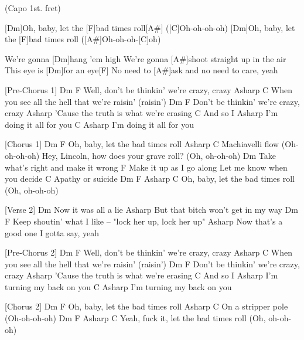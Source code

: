 
{\footnotesize(Capo 1st. fret)}

\begin{guitar}
	[Dm]Oh, baby, let the [F]bad times roll[A#] ([C]Oh-oh-oh-oh)
	[Dm]Oh, baby, let the [F]bad times roll ([A#]Oh-oh-oh-[C]oh)
	
	We're gonna [Dm]hang 'em high
	We’re gonna [A#]shoot straight up in the air
	This eye is [Dm]for an eye[F]{}
	No need to [A#]ask and no need to care, yeah
	
	
	[Pre-Chorus 1]
	Dm                     F
	Well, don't be thinkin' we're crazy, crazy
	Asharp                                      C
	When you see all the hell that we're raisin' (raisin')
	Dm                     F
	Don't be thinkin' we're crazy, crazy
	Asharp
	'Cause the truth is what we're erasing
	C
	And so I
	Asharp
	I’m doing it all for you
	C                   Asharp
	I'm doing it all for you
	
	
	[Chorus 1]
	Dm               F
	Oh, baby, let the bad times roll
	Asharp           C
	Machiavelli flow (Oh-oh-oh-oh)
	Hey, Lincoln, how does your grave roll? (Oh, oh-oh-oh)
	Dm
	Take what’s right and make it wrong
	F
	Make it up as I go along
	Let me know when you decide
	C
	Apathy or suicide
	Dm               F              Asharp         C
	Oh, baby, let the bad times roll (Oh, oh-oh-oh)
	
	
	[Verse 2]
	Dm
	Now it was all a lie
	Asharp
	But that bitch won’t get in my way
	Dm                     F
	Keep shoutin’ what I like – "lock her up, lock her up"
	Asharp
	Now that’s a good one I gotta say, yeah
	
	
	[Pre-Chorus 2]
	Dm                     F
	Well, don't be thinkin' we're crazy, crazy
	Asharp                                      C
	When you see all the hell that we're raisin' (raisin')
	Dm                     F
	Don't be thinkin' we're crazy, crazy
	Asharp
	'Cause the truth is what we're erasing
	C
	And so I
	Asharp
	I’m turning my back on you
	C                     Asharp
	I’m turning my back on you
	
	
	[Chorus 2]
	Dm               F
	Oh, baby, let the bad times roll
	Asharp              C
	On a stripper pole (Oh-oh-oh-oh)
	Dm                    F              Asharp         C
	Yeah, fuck it, let the bad times roll (Oh, oh-oh-oh)
	

\end{guitar}
